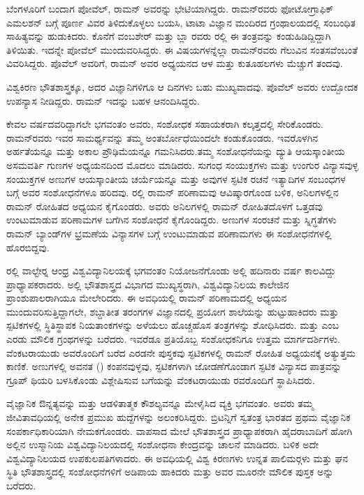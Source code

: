 ಬೆಂಗಳೂರಿಗೆ ಬಂದಾಗ ಪೋವೆಲ್, ರಾಮನ್ ಅವರನ್ನು ಭೇಟಿಯಾಗಿದ್ದರು. ರಾಮನ್‍ರವರು ಫೋಟೋಗ್ರಾಫಿಕ್ ಎಮಲಶನ್ ಬಗ್ಗೆ ಪೂರ್ಣ ವಿವರ ತಿಳಿದುಕೊಳ್ಳಲು ಬಯಸಿ, ಟಾಟಾ ವಿಜ್ಞಾನ ಮಂದಿರದ ಗ್ರಂಥಾಲಯದಲ್ಲಿ ಸಂಬಂಧಿತ ಸಾಹಿತ್ಯವನ್ನು ಹುಡುಕಿದರು. ಕೊನೆಗೆ ವಂಬಶೇರ್ ಮತ್ತು ಬ್ಲಾ ರವರು ರಲ್ಲಿ ಈ ತಂತ್ರವನ್ನು ಕಂಡುಹಿಡಿದ್ದಿದ್ದಾಗಿ ತಿಳಿಯಿತು. ಇದನ್ನೇ ಪೋವೆಲ್ ಮುಂದುವರಿಸಿದ್ದರು. ಈ ವಿಷಯಗಳನ್ನೆಲ್ಲಾ ರಾಮನ್‍ರವರು ಗೆಲುವಿನ ಸಂತಸವೆಂಬಂತೆ ವಿವರಿಸಿದ್ದರು. ಪೊವೆಲ್ ಅವರಿಗೆ, ರಾಮನ್ ಅವರ ಅಧ್ಯಯನದ ಆಳ ಮತ್ತು ಕುತೂಹಲಗಳು ಮೆಚ್ಚುಗೆ ತಂದವು.

ವಿಶ್ವಕಿರಣ ಭೌತಶಾಸ್ತ್ರಕ್ಕೂ, ಅದರ ವಿಜ್ಞಾನಿಗಳಿಗೂ ಆ ದಿನಗಳು ಬಹು ಮುಖ್ಯವಾದವು. ಪೊವೆಲ್ ಅವರು ಉದ್ಬೋದಕ ಉಪನ್ಯಾಸ ನೀಡಿದ್ದರು. ರಾಮನ್ ಇದನ್ನು ಬಹಳ ಆನಂದಿಸಿದ್ದರು.



ಕೇವಲ  ವರ್ಷದವರಿದ್ದಾಗಲೇ ಭಗವಂತಂ ಅವರು, ಸಂಶೋಧಕ ಸಹಾಯಕರಾಗಿ ಕಲ್ಕತ್ತದಲ್ಲಿ ಸೇರಿಕೊಂಡರು. ರಾಮನ್‍ರವರು ಇವರ ಸಾಮರ್ಥ್ಯವನ್ನು ತಮ್ಮ ಅಂತರ್ಬೋಧೆಯಿಂದಲೇ ಕಂಡುಕೊಂಡರು. ಇವರೊಳಗಿನ ಅರ್ಹತೆಯನ್ನೂ ಮತ್ತು ಅಕಾಲ ಪ್ರೌಢಿಮೆಯನ್ನೂ ಗಮನಿಸಿದರು.\break ತಮ್ಮ ಸಂಶೋಧನೆಯನ್ನು ದ್ಯುತಿ ಆಯಸ್ಕಾಂತೀಯ ಅಸಮವರ್ತಿ ಗುಣಗಳ ಅಧ್ಯಯನದಿಂದ ಮೊದಲು ಮಾಡಿದರು. ಸುಗಂಧ ಸಂಯುಕ್ತಗಳು ಮತ್ತು ಉಂಗುರ ವಿನ್ಯಾಸವುಳ್ಳ ಸಂಯುಕ್ತಗಳ ಅಣುಗಳ ಆಯಸ್ಕಾಂತೀಯ ಚರ್ಯೆಯನ್ನೂ ಮತ್ತು ಅವುಗಳ ಸ್ಫಟಿಕ ರಚನೆ ಇತ್ಯಾದಿಗಳ ಸಂಬಂಧಗಳ ಬಗ್ಗೆ ಅವರ ಸಂಶೋಧನೆಗಳೂ ಹರಿದವು. ರಲ್ಲಿ ರಾಮನ್ ಪರಿಣಾಮವು ಆವಿಷ್ಕಾರಗೊಂಡ ಬಳಿಕ, ಅನಿಲಗಳಲ್ಲಿನ ರಾಮನ್ ರೋಹಿತದ ಅಧ್ಯಯನ ಕೈಗೊಂಡರು. ಅವರು ಅನಿಲಗಳಲ್ಲಿ ರಾಮನ್ ರೋಹಿತದೊಳಗೆ ಒತ್ತಡವು ಉಂಟುಮಾಡುವ ಪರಿಣಾಮಗಳ ಬಗೆಗಿನ ಸಂಶೋಧನೆ ಕೈಗೊಂಡಿದ್ದರು. ಅಣುಗಳ ಸಂರಚನೆ ಮತ್ತು ಸ್ನಿಗ್ಧತೆಗಳು ರಾಮನ್ ಬ್ಯಾಂಡ್‍ಗಳ ಭ್ರಮಣೆಯ ವಿನ್ಯಾಸಗಳ ಬಗ್ಗೆ ಉಂಟುಮಾಡುವ ಪರಿಣಾಮಗಳು ಈ ಸಂಶೋಧನೆಗಳಲ್ಲಿ ಹೊರಬಿದ್ದವು.

ರಲ್ಲಿ ವಾಲ್ಟೇರ್‍ನ ಆಂಧ್ರ ವಿಶ್ವವಿದ್ಯಾನಿಲಯಕ್ಕೆ ಭಗವಂತಂ ನಿಯೋಜನೆಗೊಂಡು ಅಲ್ಲಿ ಹದಿನಾರು ವರ್ಷ ಕಾಲವಿದ್ದು ಪ್ರಾಧ್ಯಾಪಕರಾದರು. ಅಲ್ಲಿ ಭೌತಶಾಸ್ತ್ರದ ವಿಭಾಗದ ಮುಖ್ಯಸ್ಥರಾಗಿ, ವಿಶ್ವವಿದ್ಯಾನಿಲಯ ಕಾಲೇಜಿನ ಪ್ರಾಂಶುಪಾಲರಾಗಿಯೂ ಮೇಲೇರಿದರು. ಈ ಅವಧಿಯಲ್ಲಿ ರಾಮನ್ ಪರಿಣಾಮದಲ್ಲಿ ಅಧ್ಯಯನ ಮುಂದುವರಿಸುತ್ತಿದ್ದಾಗಲೇ, ಶಬ್ದಾತೀತ ತರಂಗಗಳ ವಿಜ್ಞಾನದಲ್ಲಿ ಪ್ರಯೋಗ ಶಾಲೆಯನ್ನು ಹುಟ್ಟುಹಾಕಿದರು ಮತ್ತು ಸ್ಪಟಿಕಗಳಲ್ಲಿ ಸ್ಥಿತಿಸ್ಥಾಪಕ ನಿಯತಾಂಕಗಳನ್ನು ಅಳೆಯಲು ಹೊಚ್ಚಹೊಸ ತಂತ್ರಗಳನ್ನು ಶೋಧಿಸಿದರು. \textit{} ಮತ್ತು \textit{} ಎಂಬ ಎರಡು ಮೌಲಿಕ ಗ್ರಂಥಗಳನ್ನು ಬರೆದರು. ಇವರೆಡೂ ಪ್ರತಿಯೊಬ್ಬ ಸಂಶೋಧಕನಿಗೂ ಉತ್ತಮ ಮಾರ್ಗದರ್ಶಿಗಳು. ವೆಂಕಟರಾಯುಡು ಅವರೊಂದಿಗೆ ಬರೆದ ಎರಡನೇ ಪುಸ್ತಕವು ಸ್ಫಟಿಕಗಳಲ್ಲಿ ರಾಮನ್ ರೋಹಿತ ಅಧ್ಯಯನಕ್ಕೆ ಅತ್ಯುತ್ತಮ ಕಾಣಿಕೆ. ಅಣುಗಳಲ್ಲಿ ಅವನತ () ಕಂಪನವುಳ್ಳವು, ಸ್ಫಟಿಕಗಳಾಗಿ ಜೋಡಣೆಗೊಂಡಾಗ ಸ್ಫಟಿಕ ವಿನ್ಯಾಸದ ಪಾತ್ರವನ್ನು ಗ್ರೂಪ್ ಥಿಯರಿ ಬಳಸಿಕೊಂಡು ವಿಶ್ಲೇಷಿಸುವ ಬಗೆಯನ್ನು ವೆಂಕಟರಾಯುಡು ರವರೊಂದಿಗೆ ಸ್ಥಾಪಿಸಿದರು.

ವೈಜ್ಞಾನಿಕ ಔನ್ನತ್ಯವನ್ನು ಮತ್ತು ಆಡಳಿತಾತ್ಮಕ ಕೌಶಲ್ಯವನ್ನೂ ಮೇಳೈಸಿದ ವ್ಯಕ್ತಿ ಭಗವಂತಂ. ಅವರು ತಮ್ಮ ಜೀವಿತಾವಧಿಯಲ್ಲಿ ಅನೇಕ ಪ್ರಮುಖ ಹುದ್ದೆಗಳನ್ನು ಅಲಂಕರಿಸಿದ್ದರು. ಬ್ರಿಟನ್ನಿಗೆ ಸ್ವತಂತ್ರ ಭಾರತದ ಪ್ರಥಮ ವೈಜ್ಞಾನಿಕ ಸಂಪರ್ಕಾಧಿಕಾರಿಯಾಗಿ ನೇಮಕಗೊಂಡರು. ವಾಪಸಾದ ಮೇಲೆ ಭೌತಶಾಸ್ತ್ರದ ಪ್ರಾಧ್ಯಾಪಕರಾಗಿ ಹೈದರಾಬಾದಿಗೆ ಹೋಗಿ ಅಲ್ಲಿನ ಉಸ್ಮಾನಿಯ ವಿಶ್ವವಿದ್ಯಾ\-ನಿಲಯದಲ್ಲಿ ಸಂಶೋಧನಾ ಕೇಂದ್ರವನ್ನು ಚಾಲನೆ ಮಾಡಿದರು. ಬಳಿಕ ಅದೇ ವಿಶ್ವವಿದ್ಯಾನಿಲಯದ ಉಪಕುಲಪತಿಗಳಾದರು. ಈ ಅವಧಿಯಲ್ಲಿ ವಿಶ್ವ ಕಿರಣಗಳು ಉನ್ನತ ಪಾಲಿಮರ್‍ಗಳು ಮತ್ತು ಘನ ಸ್ಥಿತಿ ಭೌತಶಾಸ್ತ್ರದಲ್ಲಿ ಸಂಶೋಧನೆಗಳಿಗೆ ಅಡಿಪಾಯ ಹಾಕಿದರು ಮತ್ತು ಅವರ ಮೂರನೇ ಮೌಲಿಕ ಪುಸ್ತಕ \textit{} ಅನ್ನು ಬರೆದರು. 

